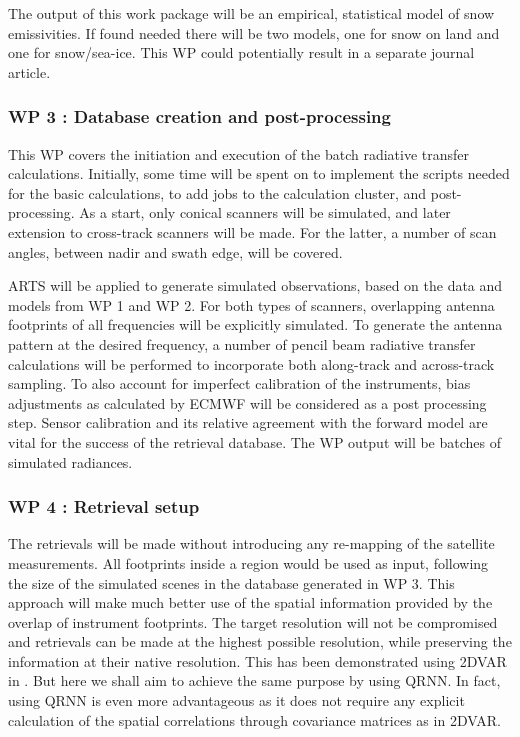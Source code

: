 \documentclass[12pt,oneside,a4paper]{article}
\begin{document}
The output of this work package will be an empirical, statistical model of
snow emissivities. If found needed there will be two models, one for snow on
land and one for snow/sea-ice. This WP could potentially result in a separate
journal article.
\vspace{-1.0ex}

\subsubsection*{WP 3 : Database creation and post-processing}
%
\label{sec:database}	
This WP covers the initiation and execution of the batch radiative
transfer calculations. Initially, some time will be spent on to implement the
scripts needed for the basic calculations, to add jobs to the calculation
cluster, and post-processing. As a start, only conical scanners will be
simulated, and later extension to cross-track scanners will be made. For the
latter, a number of scan angles, between nadir and swath edge, will be covered.

ARTS will be applied to generate simulated observations, based on the data and
models from WP 1 and WP 2. For both types of scanners, overlapping antenna
footprints of all frequencies will be explicitly simulated. To generate the
antenna pattern at the desired frequency, a number of pencil beam radiative
transfer calculations will be performed to incorporate both along-track and
across-track sampling. To also account for imperfect calibration of the
instruments, bias adjustments as calculated by ECMWF will be considered as a
post processing step. Sensor calibration and its relative agreement with the
forward model are vital for the success of the retrieval database. The WP
output will be batches of simulated radiances.  \vspace{-1.0ex}


\subsubsection*{WP 4 : Retrieval setup}
%
\label{sec:setup}
The retrievals will be made without introducing any re-mapping of the satellite
measurements. All footprints inside a region would be used as input, following
the size of the simulated scenes in the database generated in WP 3. This
approach will make much better use of the spatial information provided by the
overlap of instrument footprints. The target resolution will not be
compromised and retrievals can be made at the highest possible resolution,
while preserving the information at their native resolution. This has been
demonstrated using 2DVAR in \citet{duncan:anexp:19}. But here we shall aim to
achieve the same purpose by using QRNN. In fact, using QRNN is even more advantageous as it does not require any explicit calculation of the spatial correlations through covariance matrices as in 2DVAR.
\end{document}
